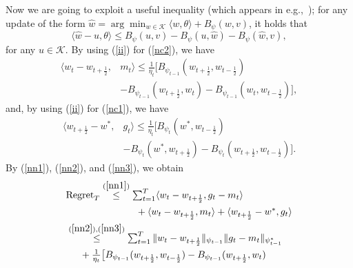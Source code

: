 \documentclass[11pt]{article}
\makeatletter
\def\K{\mathcal{K}}
\renewenvironment{proof}[1][\proofname]{%
   \par\pushQED{\qed}\normalfont%
   \topsep6\p@\@plus6\p@\relax
   \trivlist\item[\hskip\labelsep\bfseries#1]%
   \ignorespaces
}{%
   \popQED\endtrivlist\@endpefalse
}
\theoremstyle{k}
\makeatother
\begin{document}
\begin{proof}
Now we are going to exploit a useful inequality (which appears in e.g.,~\cite{T08});
for any update of the form
$\hat{w} = \arg\min_{w \in \K} \langle w, \theta \rangle + B_{\psi}(w, v)$,
it holds that
\begin{equation} \label{ii}
\textstyle{}
\langle \hat{w} - u, \theta \rangle \leq
B_{\psi}( u, v ) - B_{\psi}( u, \hat{w}) - B_{\psi}( \hat{w}, v),
\end{equation}
for any $u \in \K$.
By using (\ref{ii}) for (\ref{nc2}), we have
\begin{equation} \label{nn2}
\begin{aligned}
 \textstyle
\langle w_t - w_{t+\frac{1}{2}}, & m_t  \rangle
\leq \frac{1}{\eta_t}\big[ B_{\psi_{t-1}}( w_{t+\frac{1}{2}}, w_{t-\frac{1}{2}})
 \\
 &- B_{\psi_{t-1}}(w_{t+\frac{1}{2}}, w_t )
- B_{\psi_{t-1}}(w_{t}, w_{t-\frac{1}{2}}) \big],
\end{aligned}
\end{equation}
and, by using (\ref{ii}) for (\ref{nc1}), we have
\begin{equation} \label{nn3}
\begin{aligned}
 \textstyle
 \langle w_{t+\frac{1}{2}} - w^*, & g_t \rangle
\leq \frac{1}{\eta_t}\big[ B_{\psi_t}( w^*, w_{t-\frac{1}{2}}) \\
&-B_{\psi_t}(w^*,  w_{t+\frac{1}{2}} )
- B_{\psi_t}(w_{t+\frac{1}{2}}, w_{t-\frac{1}{2}}) \big].
\end{aligned}
\end{equation}
By (\ref{nn1}), (\ref{nn2}), and (\ref{nn3}), we obtain
\begin{equation} \label{nnn}
\begin{aligned}
\textstyle
& \textstyle
 \text{Regret}_T \overset{(\ref{nn1})}{\leq} \sum_{t=1}^T \langle  w_t - w_{t+\frac{1}{2}} , g_t - m_t \rangle
\\ &\hspace{1in} \textstyle
+ \langle w_t - w_{t+\frac{1}{2}}, m_t \rangle
+ \langle w_{t+\frac{1}{2}} - w^*, g_t  \rangle
\\ & \textstyle
\overset{(\ref{nn2}), (\ref{nn3})}{\leq}  \sum_{t=1}^T
\| w_t - w_{t+\frac{1}{2} } \|_{\psi_{t-1}} \| g_t - m_t  \|_{\psi_{t-1}^*}
\\ &\hspace{0.2in} \textstyle
+ \frac{1}{\eta_t} \big[ B_{\psi_{t-1}}( w_{t+\frac{1}{2}}, w_{t-\frac{1}{2}})
- B_{\psi_{t-1}}(w_{t+\frac{1}{2}}, w_t )
\\ &\hspace{0.3in} \textstyle

\end{aligned}
\end{equation}
\end{proof}
\end{document}
